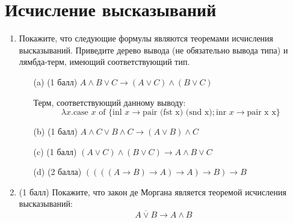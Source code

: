 \section{Исчисление высказываний}
\begin{enumerate}
  \item Покажите, что следующие формулы являются теоремами исчисления высказываний. Приведите дерево вывода (не обязательно вывода типа) и лямбда-терм, имеющий соответствующий тип.
  \begin{itemize}
    \item[(a)] (1 балл) $A \land B \lor C \rightarrow (A \lor C) \land (B \lor C)$
    \begin{solution}
      \hspace{0.01cm}
      \begin{prooftree}
      \end{prooftree}
      Терм, соответствующий данному выводу:
      \begin{equation}
        \lambda x. \text{case } x \text{ of } \{\text{inl } x \rightarrow \text{pair (fst x) (snd x)}; \text{inr } x \rightarrow \text{pair x x}\}
      \end{equation}
    \end{solution}
    \item[(b)] (1 балл) $A \land C \lor B \land C \rightarrow (A \lor B) \land C$
    \item[(c)] (1 балл) $(A \lor C) \land (B \lor C) \rightarrow A \land B \lor C$
    \item[(d)] (2 балла) $((((A \rightarrow B) \rightarrow A) \rightarrow A) \rightarrow B) \rightarrow B$
  \end{itemize}
  \item (1 балл) Покажите, что закон де Моргана является теоремой исчисления высказываний:
  $$\overline{A \lor B} \rightarrow A \land B$$
\end{enumerate}
\clearpage
